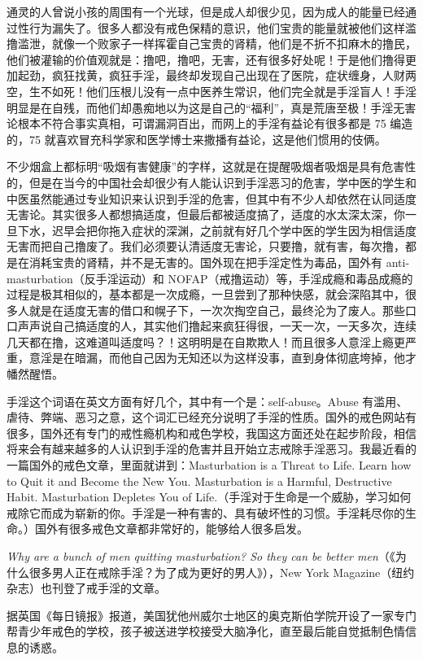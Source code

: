 通灵的人曾说小孩的周围有一个光球，但是成人却很少见，因为成人的能量已经通过性行为漏失了。很多人都没有戒色保精的意识，他们宝贵的能量就被他们这样滥撸滥泄，就像一个败家子一样挥霍自己宝贵的肾精，他们是不折不扣麻木的撸民，他们被灌输的价值观就是：撸吧，撸吧，无害，还有很多好处呢！于是他们撸得更加起劲，疯狂找黄，疯狂手淫，最终却发现自己出现在了医院，症状缠身，人财两空，生不如死！他们压根儿没有一点中医养生常识，他们完全就是手淫盲人！手淫明显是在自残，而他们却愚痴地以为这是自己的“福利”，真是荒唐至极！手淫无害论根本不符合事实真相，可谓漏洞百出，而网上的手淫有益论有很多都是 75 编造的，75 就喜欢冒充科学家和医学博士来撒播有益论，这是他们惯用的伎俩。

不少烟盒上都标明“吸烟有害健康”的字样，这就是在提醒吸烟者吸烟是具有危害性的，但是在当今的中国社会却很少有人能认识到手淫恶习的危害，学中医的学生和中医虽然能通过专业知识来认识到手淫的危害，但其中有不少人却依然在认同适度无害论。其实很多人都想搞适度，但最后都被适度搞了，适度的水太深太深，你一旦下水，迟早会把你拖入症状的深渊，之前就有好几个学中医的学生因为相信适度无害而把自己撸废了。我们必须要认清适度无害论，只要撸，就有害，每次撸，都是在消耗宝贵的肾精，并不是无害的。国外现在把手淫定性为毒品，国外有 anti-masturbation（反手淫运动）和 NOFAP（戒撸运动）等，手淫成瘾和毒品成瘾的过程是极其相似的，基本都是一次成瘾，一旦尝到了那种快感，就会深陷其中，很多人就是在适度无害的借口和幌子下，一次次掏空自己，最终沦为了废人。那些口口声声说自己搞适度的人，其实他们撸起来疯狂得很，一天一次，一天多次，连续几天都在撸，这难道叫适度吗？！这明明是在自欺欺人！而且很多人意淫上瘾更严重，意淫是在暗漏，而他自己因为无知还以为这样没事，直到身体彻底垮掉，他才幡然醒悟。

手淫这个词语在英文方面有好几个，其中有一个是：self-abuse。Abuse 有滥用、虐待、弊端、恶习之意，这个词汇已经充分说明了手淫的性质。国外的戒色网站有很多，国外还有专门的戒性瘾机构和戒色学校，我国这方面还处在起步阶段，相信将来会有越来越多的人认识到手淫的危害并且开始立志戒除手淫恶习。我最近看的一篇国外的戒色文章，里面就讲到：Masturbation is a Threat to Life. Learn how to Quit it and Become the New You. Masturbation is a Harmful, Destructive Habit. Masturbation Depletes You of Life.（手淫对于生命是一个威胁，学习如何戒除它而成为崭新的你。手淫是一种有害的、具有破坏性的习惯。手淫耗尽你的生命。）国外有很多戒色文章都非常好的，能够给人很多启发。

\textit{Why are a bunch of men quitting masturbation? So they can be better men}（《为什么很多男人正在戒除手淫？为了成为更好的男人》），New York Magazine（纽约杂志）也刊登了戒手淫的文章。

据英国《每日镜报》报道，美国犹他州威尔士地区的奥克斯伯学院开设了一家专门帮青少年戒色的学校，孩子被送进学校接受大脑净化，直至最后能自觉抵制色情信息的诱惑。

